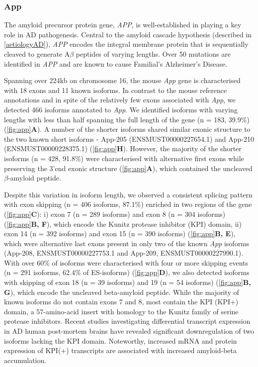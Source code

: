 \newpage
\subsubsection{App}
The amyloid precursor protein gene, \textit{APP}, is well-established in playing a key role in AD pathogenesis. Central to the amyloid cascade hypothesis (described in \cref{aetiologyAD}), \textit{APP} encodes the integral membrane protein that is sequentially cleaved to generate A$\beta$ peptides of varying lengths. Over 50 mutations are identified in \textit{APP} and are known to cause Familial's Alzheimer's Disease\cite{Li2019,D1996,JT1993}. 

Spanning over 224kb on chromosome 16, the mouse \textit{App} gene is characterised with 18 exons and 11 known isoforms. In contrast to the mouse reference annotations and in spite of the relatively few exons associated with \textit{App}, we detected 466 isoforms annotated to \textit{App}. We identified isoforms with varying lengths with less than half spanning the full length of the gene (n = 183, 39.9\%) (\cref{fig:app}\textbf{A}). A number of the shorter isoforms shared similar exonic structure to the two known short isoforms - App-205 (ENSMUST00000227654.1) and App-210 (ENSMUST00000228375.1) (\cref{fig:app}\textbf{H}). However, the majority of the shorter isoforms (n = 428, 91.8\%) were characterised with alternative first exons while preserving the 3'end exonic structure (\cref{fig:app}\textbf{A}), which contained the uncleaved $\beta$-amyloid peptide. 

Despite this variation in isoform length, we observed a consistent splicing pattern with exon skipping (n = 406 isoforms, 87.1\%) enriched in two regions of the gene (\cref{fig:app}\textbf{C}): i) exon 7 (n = 289 isoforms) and exon 8 (n = 304 isoforms) (\cref{fig:app}\textbf{B, F}), which encode the Kunitz protease inhibitor (KPI) domain, ii) exon 14 (n = 392 isoforms) and exon 15 (n = 390 isoforms) (\cref{fig:app}\textbf{B, E}), which were alternative last exons present in only two of the known \textit{App} isoforms (App-208, ENSMUST00000227753.1 and App-209, ENSMUST00000227990.1). With over 60\% of isoforms were characterised with four or more skipping events (n = 291 isoforms, 62.4\% of ES-isoforms) (\cref{fig:app}\textbf{D}), we also detected isoforms with skipping of exon 18 (n = 39 isoforms) and 19 (n = 54 isoforms) (\cref{fig:app}\textbf{B, G}), which encode the uncleaved beta-amyloid peptide. While the majority of known isoforms do not contain exons 7 and 8, most contain the KPI (KPI+) domain, a 57-amino-acid insert with homology to the Kunitz family of serine protease inhibitors. Recent studies investigating differential transcript expression in AD human post-mortem brains have revealed significant downregulation of two isoforms lacking the KPI domain\cite{Marques-Coelho2021}. Noteworthy, increased mRNA and protein expression of KPI(+) transcripts are associated with increased amyloid-beta accumulation\cite{Zhang2011}. 


